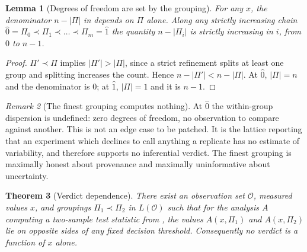 \documentclass[11pt,a4paper]{article}
\newtheorem{theorem}{Theorem}[section]
\newtheorem{lemma}[theorem]{Lemma}
\theoremstyle{definition}
\theoremstyle{remark}
\newtheorem{remark}[theorem]{Remark}
\newcommand{\Obs}{\mathcal{O}}               %
\newcommand{\Part}{\Pi}                      %
\begin{document}
\begin{lemma}[Degrees of freedom are set by the grouping]\label{lem:dof}
For any $x$, the denominator $n - |\Part|$ in  depends on
$\Part$ alone. Along any strictly increasing chain
$\hat{0} = \Part_0 \prec \Part_1 \prec \dots \prec \Part_m = \hat{1}$ the
quantity $n - |\Part_i|$ is strictly increasing in $i$, from $0$ to
$n-1$.
\end{lemma}

\begin{proof}
$\Part' \prec \Part$ implies $|\Part'| > |\Part|$, since a strict
refinement splits at least one group and splitting increases the count.
Hence $n - |\Part'| < n - |\Part|$. At $\hat{0}$, $|\Part| = n$ and the
denominator is $0$; at $\hat{1}$, $|\Part| = 1$ and it is $n-1$.
\end{proof}

\begin{remark}[The finest grouping computes nothing]\label{rem:zero-dof}
At $\hat{0}$ the within-group dispersion is undefined: zero degrees of
freedom, no observation to compare against another. This is not an edge
case to be patched. It is the lattice reporting that an experiment which
declines to call anything a replicate has no estimate of variability, and
therefore supports no inferential verdict. The finest grouping is
maximally honest about provenance and maximally uninformative about
uncertainty.
\end{remark}

\begin{theorem}[Verdict dependence]\label{thm:verdict-depends}
There exist an observation set $\Obs$, measured values $x$, and groupings
$\Part_1 \prec \Part_2$ in $L(\Obs)$ such that for the analysis $A$
computing a two-sample test statistic from , the values
$A(x,\Part_1)$ and $A(x,\Part_2)$ lie on opposite sides of any fixed
decision threshold. Consequently no verdict is a function of $x$ alone.
\end{theorem}
\end{document}
